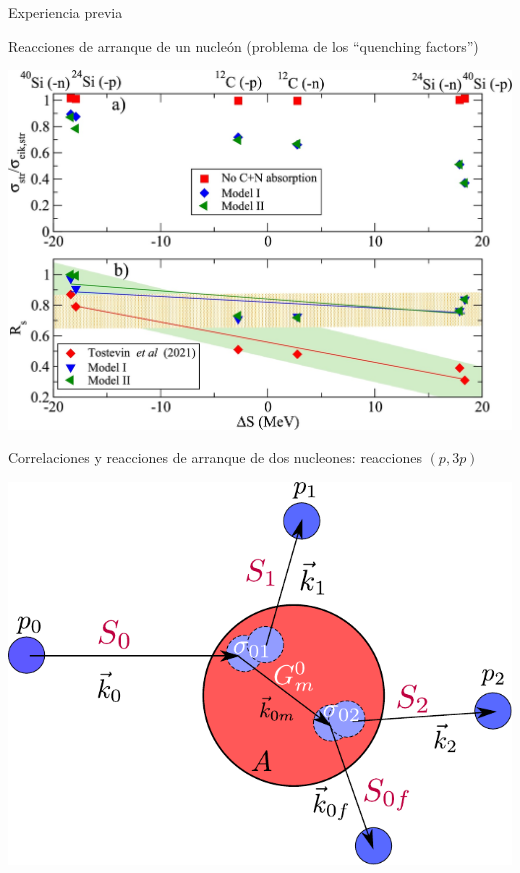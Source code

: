 \documentclass{beamer}
\begin{document}
\begin{frame}{Experiencia previa} 

   \begin{minipage}{0.45\textwidth}
    \tiny Reacciones de arranque de un nucleón (problema de los “quenching
   factors”)
   
    \includegraphics[height=0.3\textheight]{quenching.jpg}
    \end{minipage}
    \begin{minipage}{0.45\textwidth}
     \tiny Correlaciones y reacciones de arranque de dos nucleones: reacciones $(p,3p)$
    
    \includegraphics[height=0.3\textheight]{model.pdf}
    

\end{minipage}
\end{frame}
\end{document}
